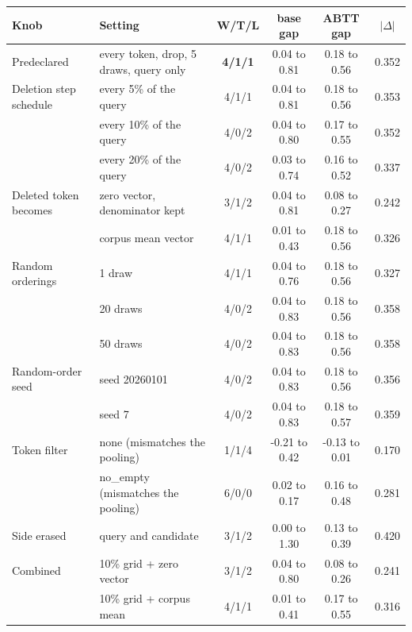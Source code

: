 \begin{table}[t]
\centering
\small
\setlength{\tabcolsep}{5pt}
\begin{tabular}{llcccc}
\toprule
Knob & Setting & W/T/L & base gap & ABTT gap & $|\Delta|$ \\
\midrule
Predeclared & every token, drop, 5 draws, query only & \textbf{4/1/1} & 0.04 to 0.81 & 0.18 to 0.56 & 0.352 \\
\addlinespace[2pt]
Deletion step schedule & every 5\% of the query & 4/1/1 & 0.04 to 0.81 & 0.18 to 0.56 & 0.353 \\
 & every 10\% of the query & 4/0/2 & 0.04 to 0.80 & 0.17 to 0.55 & 0.352 \\
 & every 20\% of the query & 4/0/2 & 0.03 to 0.74 & 0.16 to 0.52 & 0.337 \\
\addlinespace[2pt]
Deleted token becomes & zero vector, denominator kept & 3/1/2 & 0.04 to 0.81 & 0.08 to 0.27 & 0.242 \\
 & corpus mean vector & 4/1/1 & 0.01 to 0.43 & 0.18 to 0.56 & 0.326 \\
\addlinespace[2pt]
Random orderings & 1 draw & 4/1/1 & 0.04 to 0.76 & 0.18 to 0.56 & 0.327 \\
 & 20 draws & 4/0/2 & 0.04 to 0.83 & 0.18 to 0.56 & 0.358 \\
 & 50 draws & 4/0/2 & 0.04 to 0.83 & 0.18 to 0.56 & 0.358 \\
\addlinespace[2pt]
Random-order seed & seed 20260101 & 4/0/2 & 0.04 to 0.83 & 0.18 to 0.56 & 0.356 \\
 & seed 7 & 4/0/2 & 0.04 to 0.83 & 0.18 to 0.57 & 0.359 \\
\addlinespace[2pt]
Token filter & none (mismatches the pooling) & 1/1/4 & -0.21 to 0.42 & -0.13 to 0.01 & 0.170 \\
 & no\_empty (mismatches the pooling) & 6/0/0 & 0.02 to 0.17 & 0.16 to 0.48 & 0.281 \\
\addlinespace[2pt]
Side erased & query and candidate & 3/1/2 & 0.00 to 1.30 & 0.13 to 0.39 & 0.420 \\
\addlinespace[2pt]
Combined & 10\% grid + zero vector & 3/1/2 & 0.04 to 0.80 & 0.08 to 0.26 & 0.241 \\
 & 10\% grid + corpus mean & 4/1/1 & 0.01 to 0.41 & 0.17 to 0.55 & 0.316 \\

\end{tabular}
\end{table}
